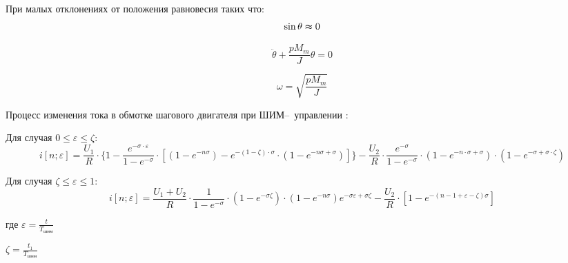 При малых отклонениях от положения равновесия таких что:
\begin{equation}
    \sin{\theta} \thickapprox 0
\end{equation}

\begin{equation}
    \label{rotor_like_harmonical_oscilator_equation}
    \ddot{\theta} + \frac{p M_{m}}{J} \theta = 0
\end{equation}

\begin{equation}
    \label{friquent_for_rotor_self_oscilating}
    \omega = \sqrt{ \frac{p M_{m}}{J} }
\end{equation}

Процесс изменения тока в обмотке шагового двигателя при ШИМ--~уп\-рав\-лен\-ии
\cite[гл. 6.4, стр. 239]{Chilikin}:

Для случая $0 \le \varepsilon \le \zeta$:
\begin{equation}
    \label{winding_current_with_pwm_control_1}
    i[ n; \varepsilon ] = \frac{ U_1 }{ R }
                            \cdot \{ 1
                                     - \frac { e^{ -\sigma \cdot \varepsilon } } { 1 - e^{-\sigma} }
                                            \cdot [ (1 - e^{-n\sigma})
                                                    - e^{ -(1 - \zeta) \cdot \sigma }
                                                        \cdot ( 1 - e^{-n\sigma + \sigma} )
                                                  ]
                                  \}
                        - \frac{ U_2 }{ R }
                            \cdot \frac {e^{-\sigma}} {1 - e^{-\sigma}}
                            \cdot ( 1 - e^{ -n \cdot \sigma + \sigma } )
                            \cdot ( 1 - e^{ -\sigma + \sigma \cdot \zeta } )
\end{equation}

Для случая $\zeta \le \varepsilon \le 1$:
\begin{equation}
    \label{winding_current_with_pwm_control_0}
    i[n; \varepsilon] =
        \frac{ U_{1} + U_{2} }{ R }
            \cdot \frac{ 1 }{ 1 - e^{-\sigma} }
            \cdot (1 - e^{-\sigma\zeta})
            \cdot (1 - e^{-n\sigma})e^{-\sigma\varepsilon + \sigma\zeta}
        - \frac{ U_{2} }{ R }
            \cdot [ 1 - e^{ -( n - 1 + \varepsilon - \zeta ) \sigma } ]
\end{equation}

где $\varepsilon = \frac{ t }{ T_\textit{шим} }$

$\zeta = \frac{ t_{1} }{ T_\textit{шим} }$

